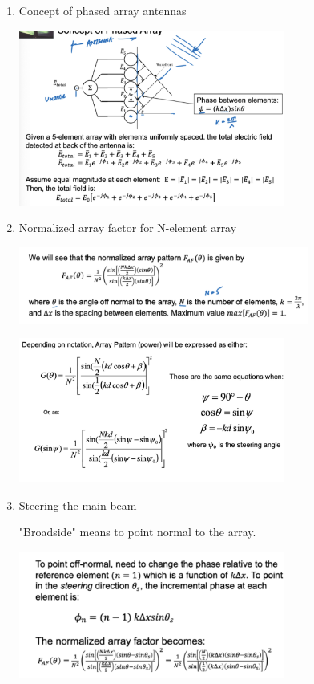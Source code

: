 \documentclass[10pt]{article}
\begin{document}
\begin{enumerate}

\item{Concept of phased array antennas}

\includegraphics[width=0.69\textwidth]{figs/phased_arrays.png}

\item{Normalized array factor for N-element array}

\includegraphics[width=0.75\textwidth]{figs/normalized_array_pattern.png}

\includegraphics[width=0.69\textwidth]{figs/array_pattern_not.png}

\item{Steering the main beam}

"Broadside" means to point normal to the array.

\includegraphics[width=0.69\textwidth]{figs/steering_array.png}


\end{enumerate}
\end{document}
